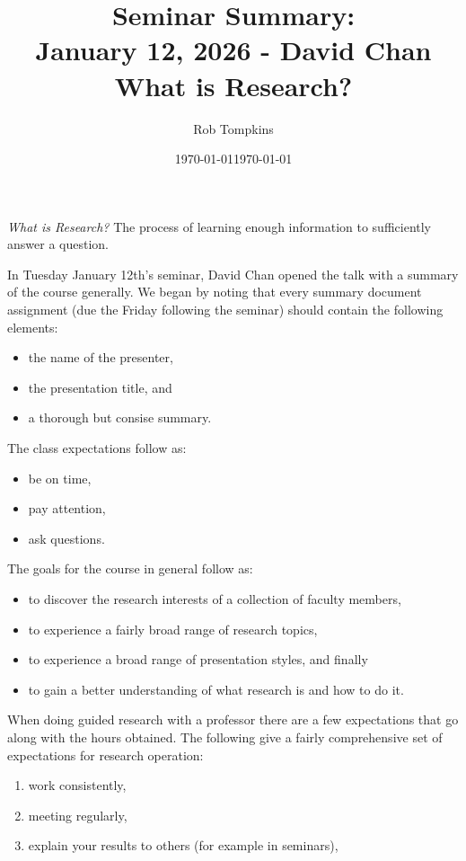 \documentclass[12pt]{amsart}
\title{Seminar Summary:\\January 12, 2026 - David Chan\\What is Research?}
\author{Rob Tompkins}
\date{\today}
\begin{document}
    \maketitle
    \date{\today}
    \begin{onehalfspace}

        \emph{What is Research?} The process of learning enough information to sufficiently answer a question.

        In Tuesday January 12th's seminar, David Chan opened the talk with a summary of the course generally. We began
        by noting that every summary document assignment (due the Friday following the seminar) should contain the following elements:
        \begin{itemize}
            \item the name of the presenter,
            \item the presentation title, and
            \item a thorough but consise summary.
        \end{itemize}
        The class expectations follow as:
        \begin{itemize}
            \item be on time,
            \item pay attention,
            \item ask questions.
        \end{itemize}
        The goals for the course in general follow as:
        \begin{itemize}
            \item to discover the research interests of a collection of faculty members,
            \item to experience a fairly broad range of research topics,
            \item to experience a broad range of presentation styles, and finally
            \item to gain a better understanding of what research is and how to do it.
        \end{itemize}
        When doing guided research with a professor there are a few expectations that go along with the hours obtained.
        The following give a fairly comprehensive set of expectations for research operation:
        \begin{enumerate}
            \item work consistently,
            \item meeting regularly,
            \item explain your results to others (for example in seminars),

\end{enumerate}
\end{onehalfspace}
\end{document}

